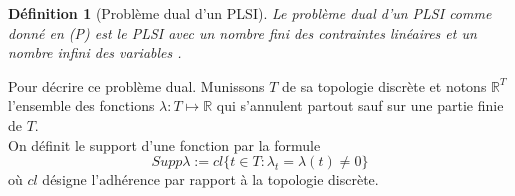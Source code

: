 \documentclass[11pt]{report}
\newenvironment{boxdefinition}
{\begin{tcolorbox}
		[enhanced jigsaw,breakable,pad at break*=1mm,
		colback=black!5!white,boxrule=0pt,frame hidden,
		borderline west={1.5mm}{-2mm}{blue}]}
	{\end{tcolorbox}}
\theoremstyle{styletheorem}
\theoremstyle{styledef}
\newtheorem{definitions}[theoreme]{Définition}
\theoremstyle{remark}
\newenvironment{definition}{\vspace*{0.3cm}\begin{boxdefinition}\begin{definitions}}{\end{definitions}\end{boxdefinition}\vspace*{0.3cm}}
\newcommand{\R}{\ensuremath{\mathbb{R}}}
\begin{document}
\begin{definition}[Problème dual d'un PLSI]
	Le problème dual d'un PLSI comme donné en (P) est le PLSI avec un nombre fini des contraintes linéaires et un nombre infini des variables \cite{b2,b16}.
\end{definition}
Pour décrire ce problème dual. Munissons $T$ de sa topologie discrète et notons $\R^T$ l'ensemble des fonctions $\lambda \colon T \mapsto \R$ qui s'annulent partout sauf sur une partie finie de $T$.\\
On définit le support d'une fonction  par la formule $$ Supp \lambda := cl \lbrace t \in T \colon \lambda_t = \lambda (t) \neq 0 \rbrace$$
où $cl$ désigne l'adhérence par rapport à la topologie discrète.\\ 
\end{document}
